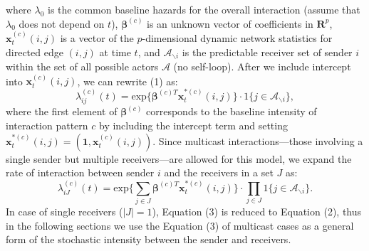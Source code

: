 \documentclass[a4paper]{article}
\begin{document}
where $\lambda_0$ is the common baseline hazards for the overall interaction (assume that $\lambda_0$ does not depend on $t$), $\boldsymbol{\beta}^{(c)}$ is an unknown vector of coefficients in $\boldsymbol{R}^{p}$, $\boldsymbol{x}^{(c)}_t(i, j)$ is a vector of the $p$-dimensional dynamic network statistics for directed edge $(i, j)$ at time $t$, and $\mathcal{A}_{\backslash i}$ is the predictable receiver set of sender $i$ within the set of all possible actors $\mathcal{A}$ (no self-loop). After we include intercept into $\boldsymbol{x}^{(c)}_t(i, j)$, we can rewrite (1) as: 
\begin{equation}
\lambda^{(c)}_{ij}(t)= \mbox{exp}\Big\{\boldsymbol{\beta}^{(c)T}\boldsymbol{x}^{*(c)}_t(i, j)\Big\}\cdot 1\{j \in \mathcal{A}_{\backslash i}\},
\end{equation}
where the first element of $\boldsymbol{\beta}^{(c)}$ corresponds to the baseline intensity of interaction pattern $c$ by including the intercept term and setting $\boldsymbol{x}^{*(c)}_t(i, j)=(\boldsymbol{1}, \boldsymbol{x}^{(c)}_t(i, j))$. Since multicast interactions—those involving a single sender but multiple
receivers—are allowed for this model, we expand the rate of interaction between sender $i$ and the receivers in a set $J$ as:
\begin{equation}
\lambda^{(c)}_{iJ}(t)= \mbox{exp}\Big\{\sum\limits_{j \in J} \boldsymbol{\beta}^{(c)T}\boldsymbol{x}^{*(c)}_t(i, j)\Big\}\cdot \prod\limits_{j \in J}1\{j \in \mathcal{A}_{\backslash i}\}.
\end{equation}
In case of single receivers ($|J|=1$),  Equation (3) is reduced to Equation (2), thus in the following sections we use the Equation (3) of multicast cases as a general form of the stochastic intensity between the sender and receivers.
\end{document}
